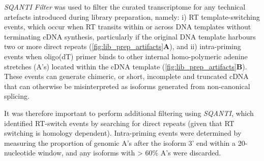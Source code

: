 \textit{SQANTI Filter} was used to filter the curated transcriptome for any technical artefacts introduced during library preparation, namely: i) RT template-switching events, which occur when RT transits within or across DNA templates without terminating cDNA synthesis, particularly if the original DNA template harbours two or more direct repeats\cite{Cocquet2006} (\cref{fig:lib_prep_artifacts}\textbf{A}), and ii) intra-priming events when oligo(dT) primer binds to other internal homo-polymeric adenine stretches (A's) located within the cDNA template\cite{Conesa2016} (\cref{fig:lib_prep_artifacts}\textbf{B}). These events can generate chimeric, or short, incomplete and truncated cDNA that can otherwise be misinterpreted as isoforms generated from non-canonical splicing\cite{Houseley2010}. 

It was therefore important to perform additional filtering using \textit{SQANTI}, which identified RT-switch events by searching for direct repeats (given that RT switching is homology dependent). Intra-priming events were determined by measuring the proportion of genomic A's after the isoform 3' end within a 20-nucleotide window, and any isoforms with > 60\% A's were discarded. 

